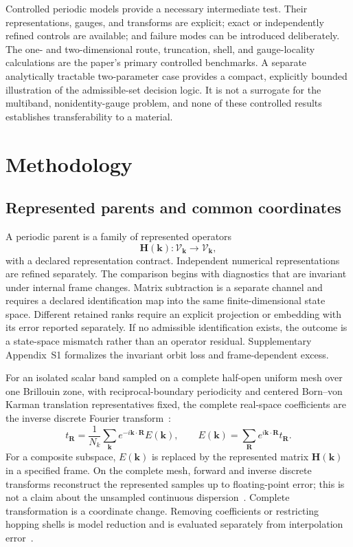 \documentclass[preprint,12pt]{elsarticle}
\begin{document}
Controlled periodic models provide a necessary intermediate test. Their
representations, gauges, and transforms are explicit; exact or independently
refined controls are available; and failure modes can be introduced
deliberately. The one- and two-dimensional route, truncation, shell, and
gauge-locality calculations are the paper's primary controlled benchmarks. A
separate analytically tractable two-parameter case provides a compact,
explicitly bounded illustration of the admissible-set decision logic. It is not
a surrogate for the multiband, nonidentity-gauge problem, and none of these
controlled results establishes transferability to a material.

\section{Methodology}
\label{sec:methodology}

\subsection{Represented parents and common coordinates}
\label{sec:represented-parents}

A periodic parent is a family of represented operators
\begin{equation}
 \bm{H}(\bm{k}):\mathcal{V}_{\bm{k}}\rightarrow\mathcal{V}_{\bm{k}},
 \label{eq:bloch-family}
\end{equation}
with a declared representation contract. Independent numerical
representations are refined separately. The comparison begins with diagnostics
that are invariant under internal frame changes. Matrix subtraction is a
separate channel and requires a declared identification map into the same
finite-dimensional state space. Different retained ranks require an explicit
projection or embedding with its error reported separately. If no admissible
identification exists, the outcome is a state-space mismatch rather than an
operator residual. Supplementary Appendix~S1 formalizes the invariant orbit
loss and frame-dependent excess.

For an isolated scalar band sampled on a complete half-open uniform mesh over
one Brillouin zone, with reciprocal-boundary periodicity and centered
Born--von Karman translation representatives fixed, the complete real-space
coefficients are the inverse discrete Fourier transform~\cite{trefethen2000}:
\begin{equation}
 t_{\bm{R}}
 =\frac{1}{N_k}\sum_{\bm{k}}
 e^{-i\bm{k}\cdot\bm{R}}E(\bm{k}),
 \qquad
 E(\bm{k})=\sum_{\bm{R}}e^{i\bm{k}\cdot\bm{R}}t_{\bm{R}}.
 \label{eq:complete-transform}
\end{equation}
For a composite subspace, $E(\bm{k})$ is replaced by the represented matrix
$\bm{H}(\bm{k})$ in a specified frame. On the complete mesh, forward and
inverse discrete transforms reconstruct the represented samples up to
floating-point error; this is not a claim about the unsampled continuous
dispersion~\cite{trefethen2000,higham2002}. Complete transformation is a
coordinate change. Removing coefficients or restricting hopping shells is
model reduction and is evaluated separately from interpolation
error~\cite{pizzi2020,yates2007}.
\end{document}
